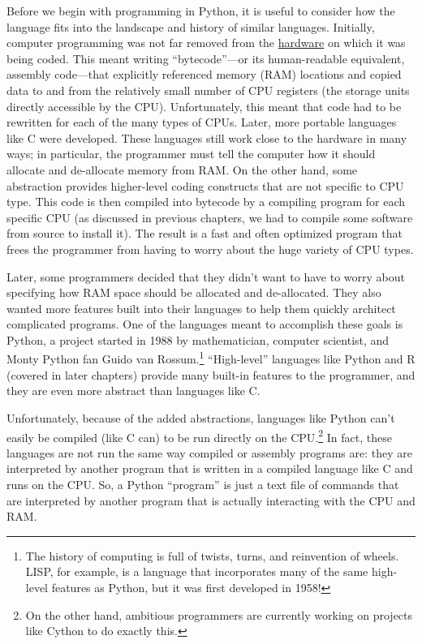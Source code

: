 \documentclass[
]{memoir}
\begin{document}
Before we begin with programming in Python, it is useful to consider how the language fits into the landscape and history of similar languages. Initially, computer programming was not far removed from the \protect\hyperlink{hardware_defs}{hardware} on which it was being coded. This meant writing \enquote{bytecode}---or its human-readable equivalent, assembly code---that explicitly referenced memory (RAM) locations and copied data to and from the relatively small number of CPU registers (the storage units directly accessible by the CPU). Unfortunately, this meant that code had to be rewritten for each of the many types of CPUs. Later, more portable languages like C were developed. These languages still work close to the hardware in many ways; in particular, the programmer must tell the computer how it should allocate and de-allocate memory from RAM. On the other hand, some abstraction provides higher-level coding constructs that are not specific to CPU type. This code is then compiled into bytecode by a compiling program for each specific CPU (as discussed in previous chapters, we had to compile some software from source to install it). The result is a fast and often optimized program that frees the programmer from having to worry about the huge variety of CPU types.

Later, some programmers decided that they didn't want to have to worry about specifying how RAM space should be allocated and de-allocated. They also wanted more features built into their languages to help them quickly architect complicated programs. One of the languages meant to accomplish these goals is Python, a project started in 1988 by mathematician, computer scientist, and Monty Python fan Guido van Rossum.\footnote{The history of computing is full of twists, turns, and reinvention of wheels. LISP, for example, is a language that incorporates many of the same high-level features as Python, but it was first developed in 1958!} \enquote{High-level} languages like Python and R (covered in later chapters) provide many built-in features to the programmer, and they are even more abstract than languages like C.

Unfortunately, because of the added abstractions, languages like Python can't easily be compiled (like C can) to be run directly on the CPU.\footnote{On the other hand, ambitious programmers are currently working on projects like Cython to do exactly this.} In fact, these languages are not run the same way compiled or assembly programs are: they are interpreted by another program that is written in a compiled language like C and runs on the CPU. So, a Python \enquote{program} is just a text file of commands that are interpreted by another program that is actually interacting with the CPU and RAM.
\end{document}
